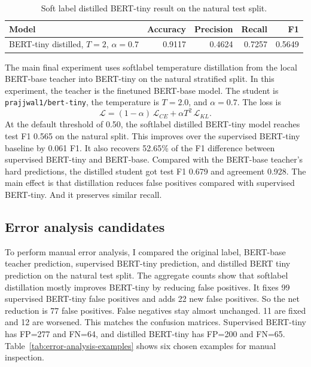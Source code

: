 \documentclass[pdflatex,sn-mathphys-num]{sn-jnl}
\begin{document}
\begin{table}[htbp]
\caption{Soft label distilled BERT-tiny result on the natural test split.}\label{tab:distilled-results}
\centering
\begin{tabular}{lrrrr}
\toprule
Model & Accuracy & Precision & Recall & F1 \\
\midrule
BERT-tiny distilled, $T=2$, $\alpha=0.7$ & 0.9117 & 0.4624 & 0.7257 & 0.5649 \\
\bottomrule
\end{tabular}
\end{table}

The main final experiment uses softlabel temperature distillation from the local BERT-base teacher into BERT-tiny on the natural stratified split.
In this experiment, the teacher is the finetuned BERT-base model.
The student is \texttt{prajjwal1/bert-tiny}, the temperature is $T=2.0$, and $\alpha=0.7$.
The loss is
\begin{equation}
    \mathcal{L}
    =
    (1-\alpha)\,\mathcal{L}_{CE}
    +
    \alpha T^2\,\mathcal{L}_{KL}.
\end{equation}
At the default threshold of 0.50, the softlabel distilled BERT-tiny model reaches test F1 0.565 on the natural split.
This improves over the supervised BERT-tiny baseline by 0.061 F1.
It also recovers 52.65\% of the F1 difference between supervised BERT-tiny and BERT-base.
Compared with the BERT-base teacher's hard predictions, the distilled student got test F1 0.679 and agreement 0.928.
The main effect is that distillation reduces false positives compared with supervised BERT-tiny.
And it preserves similar recall.

\subsection{Error analysis candidates}

To perform manual error analysis, I compared the original label, BERT-base teacher prediction, supervised BERT-tiny prediction, and distilled BERT tiny prediction on the natural test split.
The aggregate counts show that softlabel distillation mostly improves BERT-tiny by reducing false positives.
It fixes 99 supervised BERT-tiny false positives and adds 22 new false positives.
So the net reduction is 77 false positives.
False negatives stay almost unchanged.
11 are fixed and 12 are worsened.
This matches the confusion matrices.
Supervised BERT-tiny has FP=277 and FN=64, and distilled BERT-tiny has FP=200 and FN=65.
Table~\ref{tab:error-analysis-examples} shows six chosen examples for manual inspection.
\end{document}
